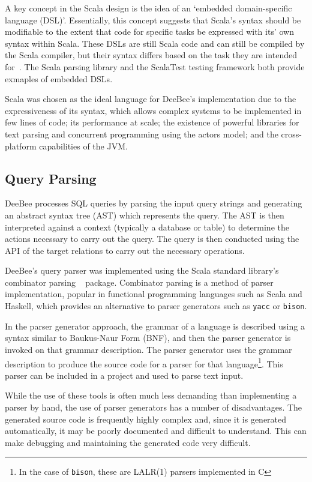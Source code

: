 A key concept in the Scala design is the idea of an `embedded domain-specific language (DSL)'. Essentially, this concept suggests that Scala's syntax should be modifiable to the extent that code for specific tasks be expressed with its' own syntax within Scala. These DSLs are still Scala code and can still be compiled by the Scala compiler, but their syntax differs based on the task they are intended for~\cite{ghosh2010dsls,hofer2008polymorphic,odersky2008programming}. The Scala parsing library and the ScalaTest testing framework both provide exmaples of embedded DSLs.

Scala was chosen as the ideal language for DeeBee's implementation due to the expressiveness of its syntax, which allows complex systems to be implemented in few lines of code; its performance at scale; the existence of powerful libraries for text parsing and concurrent programming using the actors model; and the cross-platform capabilities of the JVM.

\subsection{Query Parsing}
DeeBee processes SQL queries by parsing the input query strings and generating an abstract syntax tree (AST) which represents the query. The AST is then interpreted against a context (typically a database or table) to determine the actions necessary to carry out the query. The query is then conducted using the API of the target relations to carry out the necessary operations.

DeeBee's query parser was implemented using the Scala standard library's combinator parsing ~\cite{moors2008parser} package. Combinator parsing is a method of parser implementation, popular in functional programming languages such as Scala and Haskell, which provides an alternative to parser generators such as \texttt{yacc} or \texttt{bison}.

In the parser generator approach, the grammar of a language is described using a syntax similar to Baukus-Naur Form (BNF), and then the parser generator is invoked on that grammar description. The parser generator uses the grammar description to produce the source code for a parser for that language\footnote{In the case of \texttt{bison}, these are LALR(1) parsers implemented in C}. This parser can be included in a project and used to parse text input. 

While the use of these tools is often much less demanding than implementing a parser by hand, the use of parser generators has a number of disadvantages. The generated source code is frequently highly complex and, since it is generated automatically, it may be poorly documented and difficult to understand. This can make debugging and maintaining the generated code very difficult.


